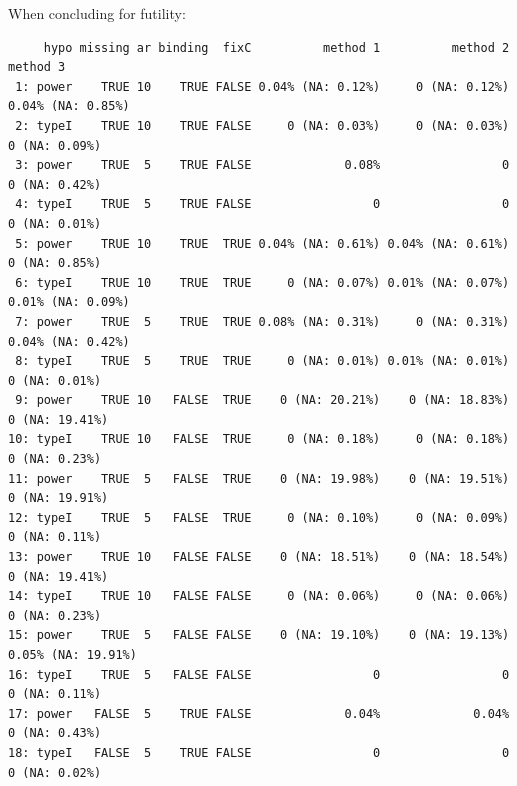 \documentclass[12pt]{article}
\begin{document}
When concluding for futility:
\begin{verbatim}
     hypo missing ar binding  fixC          method 1          method 2           method 3
 1: power    TRUE 10    TRUE FALSE 0.04% (NA: 0.12%)     0 (NA: 0.12%)  0.04% (NA: 0.85%)
 2: typeI    TRUE 10    TRUE FALSE     0 (NA: 0.03%)     0 (NA: 0.03%)      0 (NA: 0.09%)
 3: power    TRUE  5    TRUE FALSE             0.08%                 0      0 (NA: 0.42%)
 4: typeI    TRUE  5    TRUE FALSE                 0                 0      0 (NA: 0.01%)
 5: power    TRUE 10    TRUE  TRUE 0.04% (NA: 0.61%) 0.04% (NA: 0.61%)      0 (NA: 0.85%)
 6: typeI    TRUE 10    TRUE  TRUE     0 (NA: 0.07%) 0.01% (NA: 0.07%)  0.01% (NA: 0.09%)
 7: power    TRUE  5    TRUE  TRUE 0.08% (NA: 0.31%)     0 (NA: 0.31%)  0.04% (NA: 0.42%)
 8: typeI    TRUE  5    TRUE  TRUE     0 (NA: 0.01%) 0.01% (NA: 0.01%)      0 (NA: 0.01%)
 9: power    TRUE 10   FALSE  TRUE    0 (NA: 20.21%)    0 (NA: 18.83%)     0 (NA: 19.41%)
10: typeI    TRUE 10   FALSE  TRUE     0 (NA: 0.18%)     0 (NA: 0.18%)      0 (NA: 0.23%)
11: power    TRUE  5   FALSE  TRUE    0 (NA: 19.98%)    0 (NA: 19.51%)     0 (NA: 19.91%)
12: typeI    TRUE  5   FALSE  TRUE     0 (NA: 0.10%)     0 (NA: 0.09%)      0 (NA: 0.11%)
13: power    TRUE 10   FALSE FALSE    0 (NA: 18.51%)    0 (NA: 18.54%)     0 (NA: 19.41%)
14: typeI    TRUE 10   FALSE FALSE     0 (NA: 0.06%)     0 (NA: 0.06%)      0 (NA: 0.23%)
15: power    TRUE  5   FALSE FALSE    0 (NA: 19.10%)    0 (NA: 19.13%) 0.05% (NA: 19.91%)
16: typeI    TRUE  5   FALSE FALSE                 0                 0      0 (NA: 0.11%)
17: power   FALSE  5    TRUE FALSE             0.04%             0.04%      0 (NA: 0.43%)
18: typeI   FALSE  5    TRUE FALSE                 0                 0      0 (NA: 0.02%)
\end{verbatim}
\end{document}
